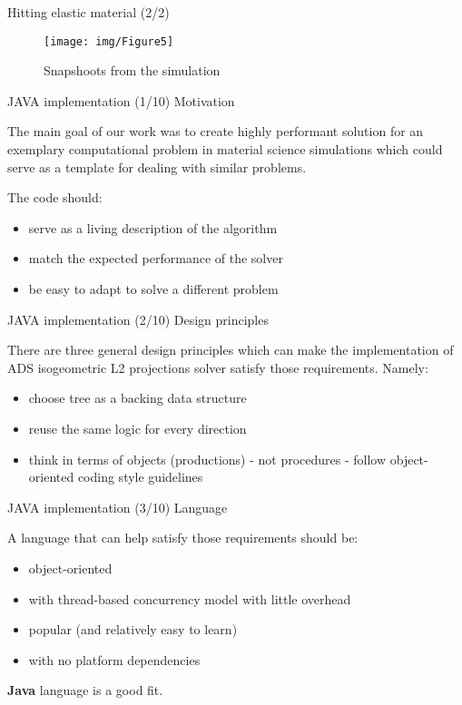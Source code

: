 \documentclass[c]{beamer}
\begin{document}
\begin{frame}{Hitting elastic material (2/2)}

    \begin{figure}
      \texttt{[image: img/Figure5]}
      \caption{Snapshoots from the simulation }
    \end{figure}


\end{frame}



\begin{frame}{JAVA implementation (1/10) Motivation}

The main goal of our work was to create highly performant solution for an exemplary computational problem in material science simulations which could serve as a template for dealing with similar problems.
\vskip 0.2in

The code should:
\begin{itemize}
  \item serve as a living description of the algorithm
  \item match the expected performance of the solver
  \item be easy to adapt to solve a different problem
\end{itemize}

\end{frame}

\begin{frame}{JAVA implementation (2/10) Design principles}

There are three general design principles which can make the implementation of ADS isogeometric L2 projections solver satisfy those requirements. Namely:
\begin{itemize}
  \item choose tree as a backing data structure
  \item reuse the same logic for every direction
  \item think in terms of objects (productions) - not procedures - follow object-oriented coding style guidelines
\end{itemize}

\end{frame}

\begin{frame}{JAVA implementation (3/10) Language}

A language that can help satisfy those requirements should be:
\begin{itemize}
  \item object-oriented
  \item with thread-based concurrency model with little overhead
  \item popular (and relatively easy to learn)
  \item with no platform dependencies
\end{itemize}

\vskip 0.2in
\textbf{Java} language is a good fit.

\end{frame}
\end{document}
